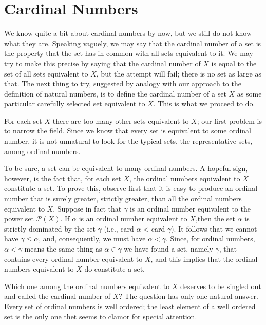 
\chapter{Cardinal Numbers} 

We know quite a bit about cardinal numbers by now, but we still do not know what they are. Speaking vaguely, we may say that the cardinal number of a set is the property that the set has in common with all sets equivalent to it. We may try to make this precise by saying that the cardinal number of $X$ is equal to the set of all sets equivalent to $X$, but the attempt will fail; there is no set as large as that. The next thing to try, suggested by analogy with our approach to the definition of natural numbers, is to define the cardinal number of a set $X$ as some particular carefully selected set equivalent to $X$. This is what we proceed to do. 

For each set $X$ there are too many other sets equivalent to $X$; our first problem is to narrow the field. Since we know that every set is equivalent to some ordinal number, it is not unnatural to look for the typical sets, the representative sets, among ordinal numbers. 

To be sure, a set can be equivalent to many ordinal numbers. A hopeful sign, however, is the fact that, for each set $X$, the ordinal numbers equivalent to $X$ constitute a set. To prove this, observe first that it is easy to produce an ordinal number that is surely greater, strictly greater, than all the ordinal numbers equivalent to $X$. Suppose in fact that $\gamma$ is an ordinal number equivalent to the power set $\mathcal{P}(X)$. If $\alpha$ is an ordinal number equivalent to $X$,then the set $\alpha$ is strictly dominated by the set $\gamma$ (i.e., card $\alpha$ < card $\gamma$). It follows that we cannot have $\gamma \le \alpha$, and, consequently, we must have $\alpha < \gamma$.  Since, for ordinal numbers, $\alpha < \gamma$ means the same thing as $\alpha \in \gamma$ we have found a set, namely $\gamma$, that contains every ordinal number equivalent to $X$, and this implies that the ordinal numbers equivalent to $X$ do constitute a set. 

Which one among the ordinal numbers equivalent to $X$ deserves to be singled out and called the cardinal number of $X$? The question has only one natural answer. Every set of ordinal numbers is well ordered; the least element of a well ordered set is the only one thet seems to clamor for special attention. 

